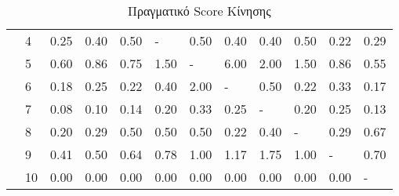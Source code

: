 \documentclass[12pt, a4paper]{article}
\begin{document}
\begin{table}[H]
\begin{tabular}{llllllllllll}
                     & \multicolumn{1}{l|}{4}  & \multicolumn{1}{l|}{0.25} & \multicolumn{1}{l|}{0.40} & \multicolumn{1}{l|}{0.50} & \multicolumn{1}{l|}{-}    & \multicolumn{1}{l|}{0.50} & \multicolumn{1}{l|}{0.40} & \multicolumn{1}{l|}{0.40} & \multicolumn{1}{l|}{0.50} & \multicolumn{1}{l|}{0.22} & \multicolumn{1}{l|}{0.29} \\ \cline{3-12} 
                     & \multicolumn{1}{l|}{5}  & \multicolumn{1}{l|}{0.60} & \multicolumn{1}{l|}{0.86} & \multicolumn{1}{l|}{0.75} & \multicolumn{1}{l|}{1.50} & \multicolumn{1}{l|}{-}    & \multicolumn{1}{l|}{6.00} & \multicolumn{1}{l|}{2.00} & \multicolumn{1}{l|}{1.50} & \multicolumn{1}{l|}{0.86} & \multicolumn{1}{l|}{0.55} \\ \cline{3-12} 
                     & \multicolumn{1}{l|}{6}  & \multicolumn{1}{l|}{0.18} & \multicolumn{1}{l|}{0.25} & \multicolumn{1}{l|}{0.22} & \multicolumn{1}{l|}{0.40} & \multicolumn{1}{l|}{2.00} & \multicolumn{1}{l|}{-}    & \multicolumn{1}{l|}{0.50} & \multicolumn{1}{l|}{0.22} & \multicolumn{1}{l|}{0.33} & \multicolumn{1}{l|}{0.17} \\ \cline{3-12} 
                     & \multicolumn{1}{l|}{7}  & \multicolumn{1}{l|}{0.08} & \multicolumn{1}{l|}{0.10} & \multicolumn{1}{l|}{0.14} & \multicolumn{1}{l|}{0.20} & \multicolumn{1}{l|}{0.33} & \multicolumn{1}{l|}{0.25} & \multicolumn{1}{l|}{-}    & \multicolumn{1}{l|}{0.20} & \multicolumn{1}{l|}{0.25} & \multicolumn{1}{l|}{0.13} \\ \cline{3-12} 
                     & \multicolumn{1}{l|}{8}  & \multicolumn{1}{l|}{0.20} & \multicolumn{1}{l|}{0.29} & \multicolumn{1}{l|}{0.50} & \multicolumn{1}{l|}{0.50} & \multicolumn{1}{l|}{0.50} & \multicolumn{1}{l|}{0.22} & \multicolumn{1}{l|}{0.40} & \multicolumn{1}{l|}{-}    & \multicolumn{1}{l|}{0.29} & \multicolumn{1}{l|}{0.67} \\ \cline{3-12} 
                     & \multicolumn{1}{l|}{9}  & \multicolumn{1}{l|}{0.41} & \multicolumn{1}{l|}{0.50} & \multicolumn{1}{l|}{0.64} & \multicolumn{1}{l|}{0.78} & \multicolumn{1}{l|}{1.00} & \multicolumn{1}{l|}{1.17} & \multicolumn{1}{l|}{1.75} & \multicolumn{1}{l|}{1.00} & \multicolumn{1}{l|}{-}    & \multicolumn{1}{l|}{0.70} \\ \cline{3-12} 
                     & \multicolumn{1}{l|}{10} & \multicolumn{1}{l|}{0.00} & \multicolumn{1}{l|}{0.00} & \multicolumn{1}{l|}{0.00} & \multicolumn{1}{l|}{0.00} & \multicolumn{1}{l|}{0.00} & \multicolumn{1}{l|}{0.00} & \multicolumn{1}{l|}{0.00} & \multicolumn{1}{l|}{0.00} & \multicolumn{1}{l|}{0.00} & \multicolumn{1}{l|}{-}    \\ \cline{3-12} 
\end{tabular}
\caption{Πραγματικό Score Κίνησης}
\end{table}
\end{document}
